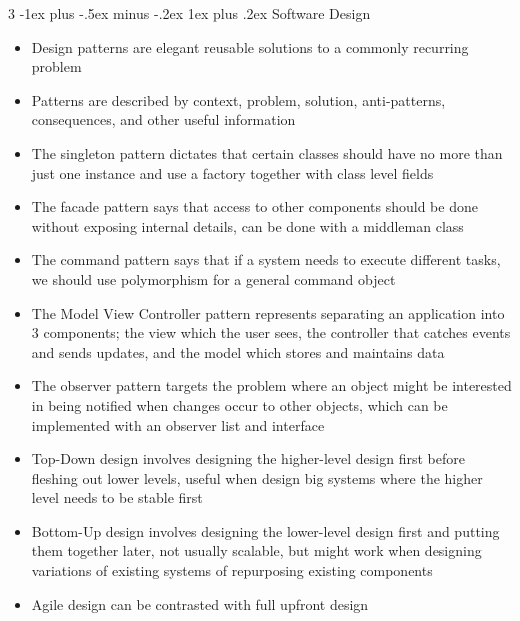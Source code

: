 \documentclass[10pt, landscape]{article}
\makeatletter
\renewcommand{\subsection}{\@startsection{subsection}{3}{0mm}%
                                {-1ex plus -.5ex minus -.2ex}%
                                {1ex plus .2ex}%
                                {\normalfont\small\bfseries}}%
\makeatother
\begin{document}
\begin{multicols*}{3}
\subsection{Software Design}
\begin{itemize}
    \item Design patterns are elegant reusable solutions to a commonly recurring problem
    \item Patterns are described by context, problem, solution, anti-patterns, consequences, and other useful information
    \item The singleton pattern dictates that certain classes should have no more than just one instance and use a factory together with class level fields
    \item The facade pattern says that access to other components should be done without exposing internal details, can be done with a middleman class
    \item The command pattern says that if a system needs to execute different tasks, we should use polymorphism for a general command object
    \item The Model View Controller pattern represents separating an application into 3 components; the view which the user sees, the controller that catches events and sends updates, and the model which stores and maintains data
    \item The observer pattern targets the problem where an object might be interested in being notified when changes occur to other objects, which can be implemented with an observer list and interface
    \item Top-Down design involves designing the higher-level design first before fleshing out lower levels, useful when design big systems where the higher level needs to be stable first
    \item Bottom-Up design involves designing the lower-level design first and putting them together later, not usually scalable, but might work when designing variations of existing systems of repurposing existing components
    \item Agile design can be contrasted with full upfront design
\end{itemize}


\end{multicols*}
\end{document}

